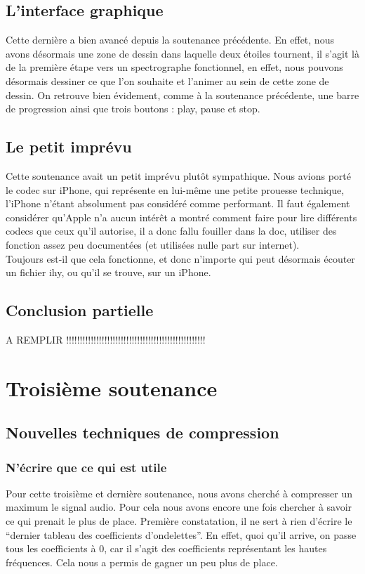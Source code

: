 \documentclass[a4paper,12pt]{report}
\begin{document}
\subsection{L'interface graphique}
Cette dernière a bien avancé depuis la soutenance précédente. En effet, nous
avons désormais une zone de dessin dans laquelle deux étoiles tournent, il
s'agit là de la première étape vers un spectrographe fonctionnel, en effet, nous
pouvons désormais dessiner ce que l'on souhaite et l'animer au sein de cette
zone de dessin. On retrouve bien évidement, comme à la soutenance précédente,
une barre de progression ainsi que trois boutons : play, pause et stop.
\subsection{Le petit imprévu}
Cette soutenance avait un petit imprévu plutôt sympathique. Nous avions porté le
codec sur iPhone, qui représente en lui-même une petite prouesse technique,
l'iPhone n'étant absolument pas considéré comme performant. Il faut également
considérer qu'Apple n'a aucun intérêt a montré comment faire pour lire
différents codecs que ceux qu'il autorise, il a donc fallu fouiller dans la doc,
utiliser des fonction assez peu documentées (et utilisées nulle part sur
internet).\\
Toujours est-il que cela fonctionne, et donc n'importe qui peut désormais
écouter un fichier ihy, ou qu'il se trouve, sur un iPhone.
\subsection{Conclusion partielle}
A REMPLIR !!!!!!!!!!!!!!!!!!!!!!!!!!!!!!!!!!!!!!!!!!!!!!!!!!!

\newpage

\section{Troisième soutenance}
\subsection{Nouvelles techniques de compression}
\subsubsection{N'écrire que ce qui est utile}
Pour cette troisième et dernière soutenance, nous avons cherché à compresser un
maximum le signal audio. Pour cela nous avons encore une fois chercher à savoir
ce qui prenait le plus de place. Première constatation, il ne sert à rien
d'écrire le ``dernier tableau des coefficients d'ondelettes''. En effet, quoi
qu'il arrive, on passe tous les coefficients à 0, car il s'agit des coefficients
représentant les hautes fréquences. Cela nous a permis de gagner un peu plus de
place.\\
\end{document}
